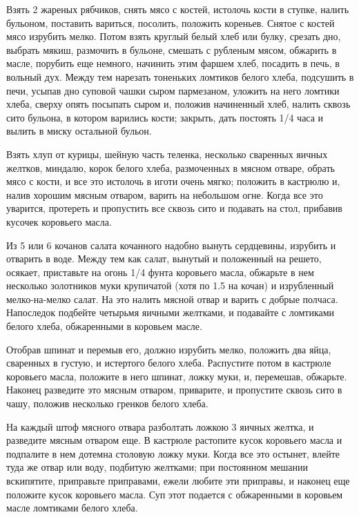 Взять 2 жареных рябчиков, снять мясо с костей, истолочь кости в ступке, налить бульоном, поставить вариться, посолить, положить кореньев. Снятое с костей мясо изрубить мелко. Потом взять круглый белый хлеб или булку, срезать дно, выбрать мякиш, размочить в бульоне, смешать с рубленым мясом, обжарить в масле, порубить еще немного, начинить этим фаршем хлеб, посадить в печь, в вольный дух. Между тем нарезать тоненьких ломтиков белого хлеба, подсушить в печи, усыпав дно суповой чашки сыром пармезаном, уложить на него ломтики хлеба, сверху опять посыпать сыром и, положив начиненный хлеб, налить сквозь сито бульона, в котором варились кости; закрыть, дать постоять 1/4 часа и вылить в миску остальной бульон.


Взять хлуп от курицы, шейную часть теленка, несколько сваренных яичных желтков, миндалю, корок белого хлеба, размоченных в мясном отваре, обрать мясо с кости, и все это истолочь в иготи очень мягко; положить в кастрюлю и, налив хорошим мясным отваром, варить на небольшом огне. Когда все это уварится, протереть и пропустить все сквозь сито и подавать на стол, прибавив кусочек коровьего масла.


Из 5 или 6 кочанов салата кочанного надобно вынуть сердцевины, изрубить и отварить в воде. Между тем как салат, вынутый и положенный на решето, осякает, приставьте на огонь 1/4 фунта коровьего масла, обжарьте в нем несколько золотников муки крупичатой (хотя по 1.5 на кочан) и изрубленный мелко-на-мелко салат. На это налить мясной отвар и варить с добрые полчаса. Напоследок подбейте четырьмя яичными желтками, и подавайте с ломтиками белого хлеба, обжаренными в коровьем масле.


Отобрав шпинат и перемыв его, должно изрубить мелко, положить два яйца, сваренных в густую, и истертого белого хлеба. Распустите потом в кастрюле коровьего масла, положите в него шпинат, ложку муки, и, перемешав, обжарьте. Наконец разведите это мясным отваром, приварите, и пропустите сквозь сито в чашу, положив несколько гренков белого хлеба.


На каждый штоф мясного отвара разболтать ложкою 3 яичных желтка, и разведите мясным отваром еще. В кастрюле растопите кусок коровьего масла и подпалите в нем дотемна столовую ложку муки. Когда все это остынет, влейте туда же отвар или воду, подбитую желтками; при постоянном мешании вскипятите, приправьте приправами, ежели любите эти приправы, и наконец еще положите кусок коровьего масла. Суп этот подается с обжаренными в коровьем масле ломтиками белого хлеба.

